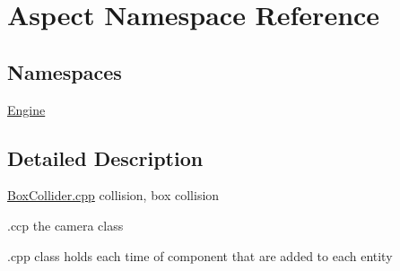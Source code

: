 \hypertarget{namespace_aspect}{}\section{Aspect Namespace Reference}
\label{namespace_aspect}
\subsection*{Namespaces}
\begin{DoxyCompactItemize}
\item 
 \mbox{\hyperlink{namespace_aspect_1_1_engine}{Engine}}
\end{DoxyCompactItemize}


\subsection{Detailed Description}
\mbox{\hyperlink{_box_collider_8cpp}{Box\+Collider.\+cpp}}  collision, box collision

.ccp  the camera class

.cpp  class holds each time of component that are added to each entity 